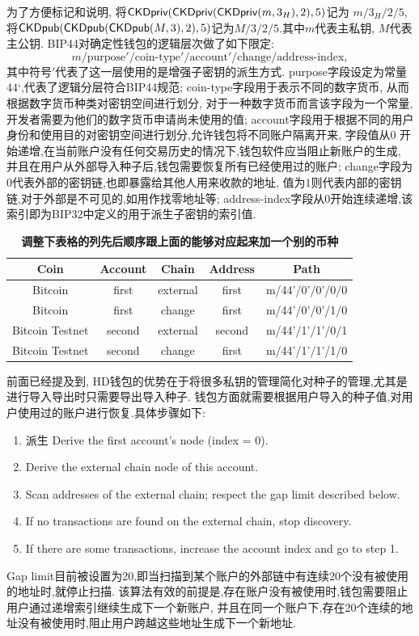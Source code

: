 为了方便标记和说明, 将$\textsf{CKDpriv} (\textsf{CKDpriv} (\textsf{CKDpriv} (m,3_H),2),5)$记为 $m/3_H/2/5$,
将$\textsf{CKDpub} (\textsf{CKDpub} (\textsf{CKDpub} (M,3),2),5)$记为$M/3/2/5$.其中$m$代表主私钥, $M$代表主公钥.
BIP44对确定性钱包的逻辑层次做了如下限定:
$$m / \text{purpose}' / \text{coin-type}' / \text{account}' / \text{change} / \text{address-index},$$
其中符号$'$代表了这一层使用的是增强子密钥的派生方式. 
purpose字段设定为常量$44‘$,代表了逻辑分层符合BIP44规范;
coin-type字段用于表示不同的数字货币, 从而根据数字货币种类对密钥空间进行划分,
对于一种数字货币而言该字段为一个常量,开发者需要为他们的数字货币申请尚未使用的值;
account字段用于根据不同的用户身份和使用目的对密钥空间进行划分,允许钱包将不同账户隔离开来,
字段值从0 开始递增,在当前账户没有任何交易历史的情况下,钱包软件应当阻止新账户的生成,
并且在用户从外部导入种子后,钱包需要恢复所有已经使用过的账户;
change字段为$0$代表外部的密钥链,也即暴露给其他人用来收款的地址,
值为$1$则代表内部的密钥链,对于外部是不可见的,如用作找零地址等;
address-index字段从0开始连续递增,该索引即为BIP32中定义的用于派生子密钥的索引值.

\begin{table}[h]
\centering
\caption{\textbf{调整下表格的列先后顺序跟上面的能够对应起来加一个别的币种}}
\begin{tabular}{|c|c|c|c|c|}
\hline
\small
Coin &  Account  &   Chain  &  Address &  Path \\\hline
Bitcoin &  first  &  external &  first &  m/44'/0'/0'/0/0 \\\hline
Bitcoin &  first  &  change &  first &  m/44'/0'/0'/1/0 \\\hline
Bitcoin Testnet &  second  &  external &  second &  m/44'/1'/1'/0/1\\\hline
Bitcoin Testnet &  second  &  change &  first &  m/44'/1'/1'/1/0\\\hline
\end{tabular}
\end{table}

前面已经提及到, HD钱包的优势在于将很多私钥的管理简化对种子的管理,尤其是进行导入导出时只需要导出导入种子.
钱包方面就需要根据用户导入的种子值,对用户使用过的账户进行恢复.具体步骤如下:
\begin{enumerate}
\item 派生
Derive the first account's node (index = 0).
\item Derive the external chain node of this account.
\item Scan addresses of the external chain; respect the gap limit described below.
\item If no transactions are found on the external chain, stop discovery.
\item If there are some transactions, increase the account index and go to step 1.
\end{enumerate}
Gap limit目前被设置为20,即当扫描到某个账户的外部链中有连续20个没有被使用的地址时,就停止扫描.
该算法有效的前提是,存在账户没有被使用时,钱包需要阻止用户通过递增索引继续生成下一个新账户,
并且在同一个账户下,存在20个连续的地址没有被使用时,阻止用户跨越这些地址生成下一个新地址.

